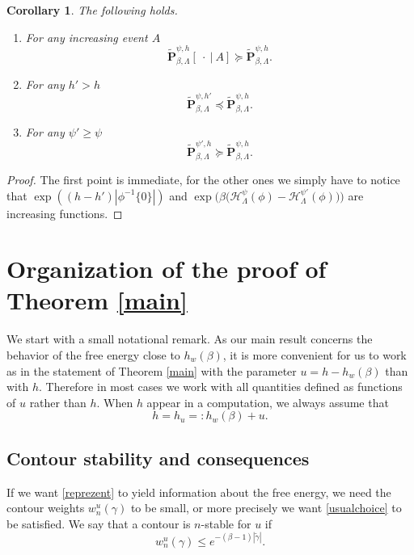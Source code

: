 \documentclass[JEP,XML,SOM,Unicode, NoFloatCountersInSection]{cedram}
\let\mathcal\mathscr
\newenvironment{enumeratei}
{\bgroup\def\theenumi{\roman{enumi}}\def\theenumii{\Alph{enumii}}\begin{enumerate}}
{\end{enumerate}\egroup}
\numberwithin{equation}{section}
\theoremstyle{plain}
\newtheorem{cor}[theorem]{Corollary}
\theoremstyle{definition}
\newcommand{\cH}{{\ensuremath{\mathcal H}} }
\newcommand{\bP}{{\ensuremath{\mathbf P}} }
\newcommand{\gb}{\beta}
\newcommand{\gL}{\Lambda}
\begin{document}
\begin{cor}\label{FKalt}
The following holds.
\begin{enumeratei}
\item
For any increasing event $A$
\begin{equation*}%
\tilde \bP^{\psi,h}_{\gb,\gL}[ \ \cdot \ | \ A] \succcurlyeq \tilde \bP^{\psi,h}_{\gb,\gL}.
\end{equation*}
\item
For any $h'>h$
\begin{equation*}
\tilde \bP^{\psi,h'}_{\gb,\gL} \preccurlyeq \tilde \bP^{\psi,h}_{\gb,\gL}.
\end{equation*}
\item
For any $\psi'\ge \psi$
\begin{equation*}
\tilde \bP^{\psi',h}_{\gb,\gL} \succcurlyeq \tilde \bP^{\psi,h}_{\gb,\gL}.
\end{equation*}
\end{enumeratei}
\end{cor}

\begin{proof}
The first point is immediate, for the other ones we simply have to notice that
$\exp((h-h')|\phi^{-1}\{0\}|)$ and $\exp\bigl(\gb \bigl(\cH^\psi_\gL(\phi)-\cH^{\psi'}_\gL(\phi) \bigr) \bigr)$ are increasing functions.
\end{proof}

\section{Organization of the proof of Theorem \ref{main}}\label{zorga}

We start with a small notational remark. As our main result concerns the behavior of the free energy close to $h_w(\gb)$,
it is more convenient for us to work as in the statement of Theorem \ref{main} with the parameter $u=h-h_w(\gb)$ than with $h$.
Therefore in most cases we work with all quantities defined as functions of $u$ rather than $h$.
When $h$ appear in a computation, we always assume that
\[
h=h_u=: h_w(\gb)+u.
\]

\subsection{Contour stability and consequences}\label{stabcon}

If we want \eqref{reprezent} to yield information about the free energy, we need the contour weights $w^u_n(\gamma)$ to be small, or more precisely
we want \eqref{usualchoice} to be satisfied.
We say that a contour is $n$-stable for $u$ if
\begin{equation}\label{stability}
w^u_n(\gamma)\le e^{-(\gb-1) |\tilde \gamma|}.
\end{equation}
\end{document}
